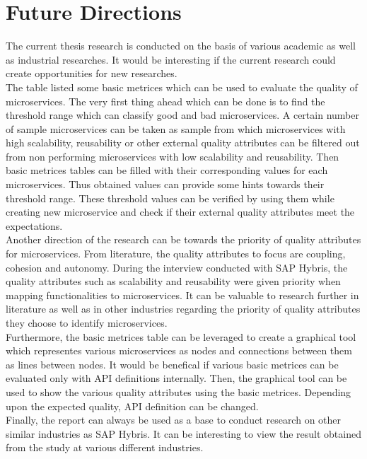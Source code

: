 \chapter{Future Directions}\label{chapter:future_directions}
The current thesis research is conducted on the basis of various academic as well as industrial researches. It would be interesting if the current research could create opportunities for new researches.\\
The table listed some basic metrices which can be used to evaluate the quality of microservices. The very first thing ahead which can be done is to find the threshold range which can classify good and bad microservices. A certain number of sample microservices can be taken as sample from which microservices with high scalability, reusability or other external quality attributes can be filtered out from non performing microservices with low scalability and reusability. Then basic metrices tables can be filled with their corresponding values for each microservices. Thus obtained values can provide some hints towards their threshold range. These threshold values can be verified by using them while creating new microservice and check if their external quality attributes meet the expectations.\\
Another direction of the research can be towards the priority of quality attributes for microservices. From literature, the quality attributes to focus are coupling, cohesion and autonomy. During the interview conducted with SAP Hybris, the quality attributes such as scalability and reusability were given priority when mapping functionalities to microservices. It can be valuable to research further in literature as well as in other industries regarding the priority of quality attributes they choose to identify microservices.\\
Furthermore, the basic metrices table can be leveraged to create a graphical tool which representes various microservices as nodes and connections between them as lines between nodes. It would be benefical if various basic metrices can be evaluated only with \acrshort{API} definitions internally. Then, the graphical tool can be used to show the various quality attributes using the basic metrices. Depending upon the expected quality, \acrshort{API} definition can be changed.\\
Finally, the report can always be used as a base to conduct research on other similar industries as SAP Hybris. It can be interesting to view the result obtained from the study at various different industries.

